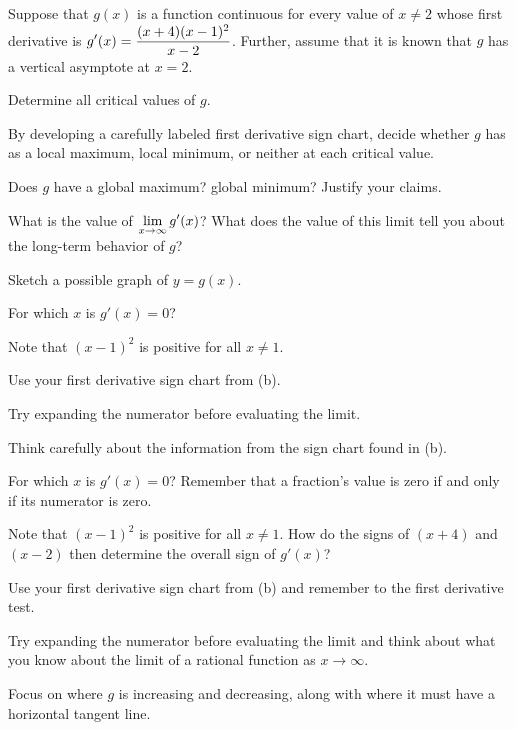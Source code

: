 \begin{activity} \label{A:3.2.1}  Suppose that $g(x)$ is a function continuous for every value of $x \ne 2$ whose first derivative is $\displaystyle g'(x) = \frac{(x+4)(x-1)^2}{x-2}$.  Further, assume that it is known that $g$ has a vertical asymptote at $x = 2$.
\ba
  \item Determine all critical values of $g$.
  \item By developing a carefully labeled first derivative sign chart, decide whether $g$ has  as a local maximum, local minimum, or neither at each critical value.
  \item Does $g$ have a global maximum? global minimum? Justify your claims.
  \item What is the value of $\displaystyle \lim_{x \to \infty} g'(x)$?  What does the value of this limit tell you about the long-term behavior of $g$?
  \item Sketch a possible graph of $y = g(x)$.
\ea
\end{activity}
\begin{smallhint}
\ba
	\item For which $x$ is $g'(x) = 0$?
	\item Note that $(x-1)^2$ is positive for all $x \ne 1$.
	\item Use your first derivative sign chart from (b).
	\item Try expanding the numerator before evaluating the limit.
	\item Think carefully about the information from the sign chart found in (b).
\ea
\end{smallhint}
\begin{bighint}
\ba
	\item For which $x$ is $g'(x) = 0$?  Remember that a fraction's value is zero if and only if its numerator is zero.
	\item Note that $(x-1)^2$ is positive for all $x \ne 1$.  How do the signs of $(x+4)$ and $(x-2)$ then determine the overall sign of $g'(x)$?
	\item Use your first derivative sign chart from (b) and remember to the first derivative test.
	\item Try expanding the numerator before evaluating the limit and think about what you know about the limit of a rational function as $x \to \infty$.
	\item Focus on where $g$ is increasing and decreasing, along with where it must have a horizontal tangent line.
\ea
\end{bighint}

